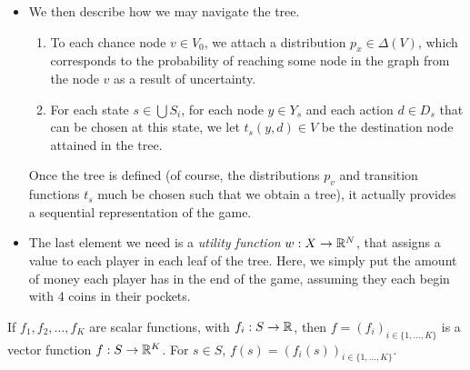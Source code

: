 \begin{example}
\begin{itemize}
\item We then describe how we may navigate the tree.
\begin{enumerate}
\item To each chance node $v \in V_0$, we attach a distribution $p_x \in \Delta(V)$, which corresponds to the probability of reaching some node in the graph from the node $v$ as a result of uncertainty.
\item For each state $s \in \bigcup S_i$, for each node $y \in Y_s$ and each action $d \in D_s$ that can be chosen at this state, we let $t_s(y,d) \in V$ be the destination node attained in the tree.
\end{enumerate}
Once the tree is defined (of course, the distributions $p_v$ and transition functions $t_s$ much be chosen such that we obtain a tree), it actually provides a sequential representation of the game.
\item The last element we need is a \emph{utility function} $w : X \rightarrow \mathbb{R}^N$, that assigns a value to each player in each leaf of the tree. Here, we simply put the amount of money each player has in the end of the game, assuming they each begin with 4 coins in their pockets.
\end{itemize}
\end{example}





\begin{notation}
If $f_1, f_2, \ldots, f_K$ are scalar functions, with $f_i : S \rightarrow \mathbb{R}$,
then $f = (f_i)_{i \in \{1,\ldots, K\}}$ is a vector function $f : S \rightarrow \mathbb{R}^K$.
For $s  \in S$,
$f(s) = (f_i(s))_{i \in \{1, \ldots, K\}}.$
\end{notation}

